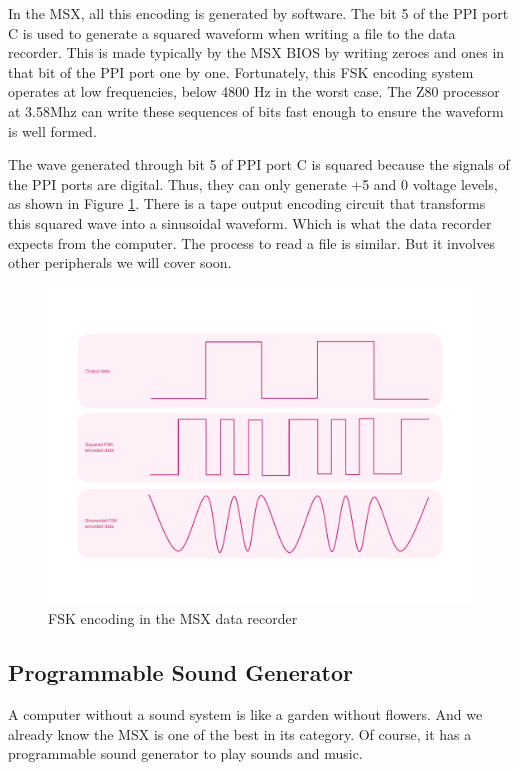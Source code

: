 In the MSX, all this encoding is generated by software. The bit 5 of the PPI port C is used to generate a squared waveform when writing a file to the data recorder. This is made typically by the MSX BIOS by writing zeroes and ones in that bit of the PPI port one by one. Fortunately, this FSK encoding system operates at low frequencies, below 4800 Hz in the worst case. The Z80 processor at 3.58Mhz can write these sequences of bits fast enough to ensure the waveform is well formed. 

The wave generated through bit 5 of PPI port C is squared because the signals of the PPI ports are digital. Thus, they can only generate +5 and 0 voltage levels, as shown in Figure \ref{fig:msx-arch-fskenc}. There is a tape output encoding circuit that transforms this squared wave into a sinusoidal waveform. Which is what the data recorder expects from the computer. The process to read a file is similar. But it involves other peripherals we will cover soon.

\begin{figure}
	\centering
	\includegraphics[width=1\linewidth,trim={0cm 80 0 80}]{images/figures/msx-arch-fskenc}
	\caption{FSK encoding in the MSX data recorder}
	\label{fig:msx-arch-fskenc}
\end{figure}

\subsection{Programmable Sound Generator}

A computer without a sound system is like a garden without flowers. And we already know the MSX is one of the best in its category. Of course, it has a programmable sound generator to play sounds and music. 

